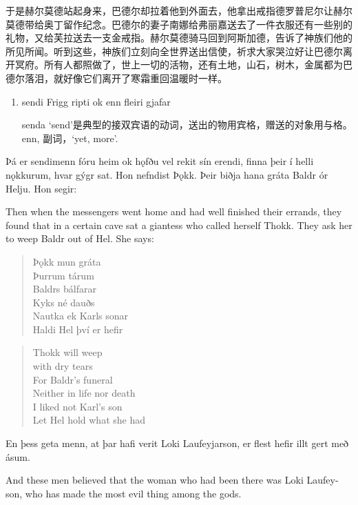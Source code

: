 \begin{translation*}{}
    于是赫尔莫德站起身来，巴德尔却拉着他到外面去，他拿出戒指德罗普尼尔让赫尔莫德带给奥丁留作纪念。巴德尔的妻子南娜给弗丽嘉送去了一件衣服还有一些别的礼物，又给芙拉送去一支金戒指。赫尔莫德骑马回到阿斯加德，告诉了神族们他的所见所闻。听到这些，神族们立刻向全世界送出信使，祈求大家哭泣好让巴德尔离开冥府。所有人都照做了，世上一切的活物，还有土地，山石，树木，金属都为巴德尔落泪，就好像它们离开了寒霜重回温暖时一样。
\end{translation*}
\begin{grammar*}{}
    \begin{enumerate}[leftmargin=*]
        \item sendi Frigg ripti ok enn fleiri gjafar

              senda `send'是典型的接双宾语的动词，送出的物用宾格，赠送的对象用与格。enn, 副词，`yet, more'.
    \end{enumerate}
\end{grammar*}
\begin{paracol}{2}
    Þá er sendimenn fóru heim ok hǫfðu vel rekit sín erendi, finna þeir í helli nǫkkurum, hvar gýgr sat. Hon nefndist Þǫkk. Þeir biðja hana gráta Baldr ór Helju. Hon segir:

    \switchcolumn

    Then when the messengers went home and had well finished their errands, they found that in a certain cave sat a giantess who called herself Thokk. They ask her to weep Baldr out of Hel. She says:
    \switchcolumn*

    \begin{quote}
        Þǫkk mun gráta\\
        Þurrum tárum\\
        Baldrs bálfarar\\
        Kyks né dauðs\\
        Nautka ek Karls sonar\\
        Haldi Hel því er hefir
    \end{quote}

    \switchcolumn

    \begin{quote}
        Thokk will weep\\
        with dry tears\\
        For Baldr's funeral\\
        Neither in life nor death\\
        I liked not Karl's son\\
        Let Hel hold what she had
    \end{quote}

    \switchcolumn*
    En þess geta menn, at þar hafi verit Loki Laufeyjarson, er flest hefir illt gert með ásum.

    \switchcolumn

    And these men believed that the woman who had been there was Loki Laufey-son, who has made the most evil thing among the gods.
\end{paracol}
